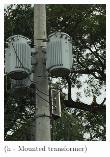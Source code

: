 \begin{figure}[!h]
\begin{minipage}[b]{0.22\linewidth}
	\includegraphics[width=\textwidth]{figures/fig_ch04_elecaudit_visualinspection_mountedtransformer}
	\caption*{(h - Mounted transformer)}
\end{minipage}
	\hspace{0.03cm}
\begin{minipage}[b]{0.22\linewidth}

\end{minipage}
\end{figure}
